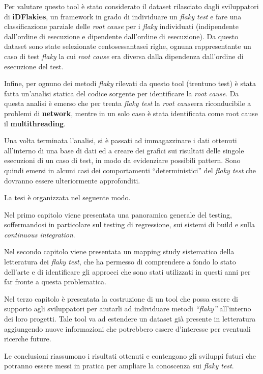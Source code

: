 Per valutare questo tool è stato considerato il dataset rilasciato dagli
sviluppatori di \textbf{iDFlakies}, un framework in grado di individuare un \emph{flaky test} e fare
una classificazione parziale delle \emph{root cause} per i \emph{flaky} individuati (indipendente
dall’ordine di esecuzione e dipendente dall’ordine di esecuzione). Da questo dataset sono state selezionate centosessantasei righe, ognuna rappresentante un caso di test
\emph{flaky} la cui \emph{root cause} era diversa dalla dipendenza dall’ordine di esecuzione del
test.

Infine, per ognuno dei metodi \emph{flaky} rilevati da questo tool (trentuno test) è stata fatta un'analisi statica del codice sorgente per identificare la \emph{root cause}. Da questa analisi è emerso che per trenta \emph{flaky test} la \emph{root cause}era riconducibile a problemi di \textbf{network}, mentre in un solo caso è stata identificata come root cause il \textbf{multithreading}.

Una volta terminata l’analisi, si è passati ad immagazzinare i dati ottenuti
all’interno di una base di dati ed a creare dei grafici sui risultati delle singole
esecuzioni di un caso di test, in modo da evidenziare possibili pattern. Sono quindi
emersi in alcuni casi dei comportamenti “deterministici” del \emph{flaky test } che dovranno essere ulteriormente approfonditi.

La tesi è organizzata nel seguente modo.

Nel primo capitolo viene presentata una panoramica generale del testing, soffermandosi in particolare sul testing di regressione, sui sistemi di build e sulla \emph{continuous integration}.

Nel secondo capitolo viene presentata un mapping study sistematico della letteratura dei \emph{flaky test}, che ha permesso di comprendere a fondo lo stato dell’arte e di identificare gli approcci che sono stati utilizzati in questi anni per far fronte a
questa problematica.

Nel terzo capitolo è presentata la costruzione di un tool che possa essere di supporto agli sviluppatori per aiutarli ad individuare metodi \emph{“flaky”} all’interno dei loro progetti. Tale tool va ad estendere un dataset già presente in letteratura
aggiungendo nuove informazioni che potrebbero essere d’interesse per eventuali ricerche future.

Le conclusioni riassumono i risultati ottenuti e contengono gli sviluppi futuri che potranno essere messi in pratica per ampliare la conoscenza sui \emph{flaky test}.
